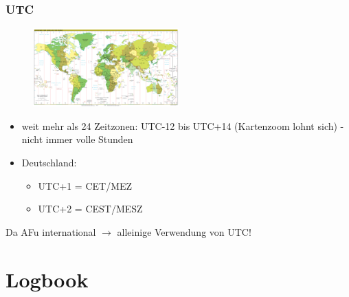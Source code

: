 \begin{frame}
  \frametitle{UTC}

  \begin{center}
    \begin{figure}
      \includegraphics[width=0.5\textwidth,height=.35\textheight,keepaspectratio]{bv13/Standard_time_zones_of_the_world.png}
    \end{figure}
  \end{center}

  \begin{itemize}
    \item weit mehr als 24 Zeitzonen: UTC-12 bis UTC+14 (Kartenzoom lohnt sich)
      - nicht immer volle Stunden
    \item Deutschland:
      \begin{itemize}
        \item UTC+1 = CET/MEZ
        \item UTC+2 = CEST/MESZ
      \end{itemize}
  \end{itemize}

  Da AFu international $\rightarrow$ alleinige Verwendung von UTC!

\end{frame}

\section{Logbook}

